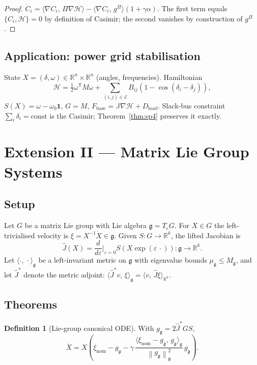 \documentclass[11pt,a4paper]{article}
\theoremstyle{definition}
\newtheorem{definition}[theorem]{Definition}
\newcommand{\Fbase}{F_{\mathrm{base}}}
\newcommand{\R}{\mathbb{R}}
\newcommand{\T}{^{\mathsf{T}}}
\newcommand{\norm}[1]{\left\|#1\right\|}
\newcommand{\inner}[2]{\langle #1,\,#2\rangle}
\newcommand{\nom}{\mathrm{nom}}
\newcommand{\fr}{\mathfrak}
\newcommand{\half}{\tfrac{1}{2}}
\begin{document}
\begin{proof}
$\dot C_i = \inner{\nabla C_i}{\Pi \nabla \mathcal{H}} - \inner{\nabla C_i}{g^\Pi}(1+\gamma\alpha)$. The first term equals $\{C_i, \mathcal{H}\} = 0$ by definition of Casimir; the second vanishes by construction of $g^\Pi$.
\end{proof}

\subsection{Application: power grid stabilisation}

State $X = (\delta, \omega) \in \R^n \times \R^n$ (angles, frequencies). Hamiltonian
\[
\mathcal{H} = \half \omega\T M \omega + \sum_{(i,j)\in\mathcal{E}} B_{ij}(1 - \cos(\delta_i - \delta_j)),
\]
$S(X) = \omega - \omega_0 \mathbf{1}$, $G = M$, $\Fbase = \mathbb{J}\nabla \mathcal{H} + D_{\mathrm{load}}$. Slack-bus constraint $\sum_i \delta_i = \text{const}$ is the Casimir; Theorem~\ref{thm:sp4} preserves it exactly.

\newpage

\section{Extension II --- Matrix Lie Group Systems}

\subsection{Setup}

Let $G$ be a matrix Lie group with Lie algebra $\fr{g} = T_e G$. For $X \in G$ the left-trivialised velocity is $\xi = X^{-1}\dot X \in \fr{g}$. Given $S : G \to \R^k$, the lifted Jacobian is
\[
\hat J(X) = \frac{d}{d\varepsilon}\bigg|_{\varepsilon=0} S(X \exp(\varepsilon\,\cdot)) : \fr{g} \to \R^k.
\]
Let $\inner{\cdot}{\cdot}_\fr{g}$ be a left-invariant metric on $\fr{g}$ with eigenvalue bounds $\mu_\fr{g} \leq M_\fr{g}$, and let $\hat J^\ast$ denote the metric adjoint: $\inner{\hat J^\ast v}{\xi}_\fr{g} = \inner{v}{\hat J \xi}_{\R^k}$.

\subsection{Theorems}

\begin{definition}[Lie-group canonical ODE]
\label{def:lg-ode}
With $g_\fr{g} = 2\hat J^\ast G S$,
\[
\dot X = X\!\left(\xi_\nom - g_\fr{g} - \gamma\,\frac{\inner{\xi_\nom - g_\fr{g}}{g_\fr{g}}_\fr{g}}{\norm{g_\fr{g}}^2_\fr{g}}\,g_\fr{g}\right)\!.
\]
\end{definition}
\end{document}
